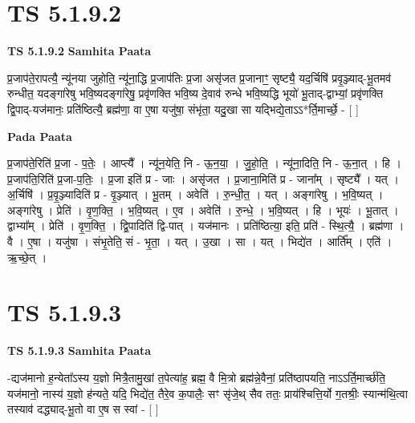\documentclass[17pt]{extarticle}
\begin{document}

\section{ TS 5.1.9.2 }

\textbf{TS 5.1.9.2 } \newline
\textbf{Samhita Paata} \newline

प्र॒जाप॑ते॒रापत्यै॒ न्यू॑नया जुहोति॒ न्यू॑ना॒द्धि प्र॒जाप॑तिः प्र॒जा असृ॑जत प्र॒जानाꣳ॒॒ सृष्ट्यै॒ यद॒र्चिषि॑ प्रवृ॒ञ्ज्याद्-भू॒तमव॑ रुन्धीत॒ यदङ्गा॑रेषु भवि॒ष्यदङ्गा॑रेषु॒ प्रवृ॑णक्ति भवि॒ष्य दे॒वाव॑ रुन्धे भवि॒ष्यद्धि भूयो॑ भू॒ताद्-द्वाभ्यां॒ प्रवृ॑णक्ति द्वि॒पाद्-यज॑मानः॒ प्रति॑ष्ठित्यै॒ ब्रह्म॑णा॒ वा ए॒षा यजु॑षा॒ संभृ॑ता॒ यदु॒खा सा यद्भिद्ये॒ताऽऽ*र्ति॒मार्च्छे॒ - [  ] \newline

\textbf{Pada Paata} \newline

प्र॒जाप॑ते॒रिति॑ प्र॒जा - प॒तेः॒ । आप्त्यै᳚ । न्यू॑न॒येति॒ नि - ऊ॒न॒या॒ । जु॒हो॒ति॒ । न्यू॑ना॒दिति॒ नि - ऊ॒ना॒त् । हि । प्र॒जाप॑ति॒रिति॑ प्र॒जा-प॒तिः॒ । प्र॒जा इति॑ प्र - जाः । असृ॑जत । प्र॒जाना॒मिति॑ प्र - जाना᳚म् । सृष्ट्यै᳚ । यत् । अ॒र्चिषि॑ । प्र॒वृ॒ञ्ज्यादिति॑ प्र - वृ॒ञ्ज्यात् । भू॒तम् । अवेति॑ । रु॒न्धी॒त॒ । यत् । अङ्गा॑रेषु । भ॒वि॒ष्यत् । अङ्गा॑रेषु । प्रेति॑ । वृ॒ण॒क्ति॒ । भ॒वि॒ष्यत् । ए॒व । अवेति॑ । रु॒न्धे॒ । भ॒वि॒ष्यत् । हि । भूयः॑ । भू॒तात् । द्वाभ्या᳚म् । प्रेति॑ । वृ॒ण॒क्ति॒ । द्वि॒पादिति॑ द्वि-पात् । यज॑मानः । प्रति॑ष्ठित्या॒ इति॒ प्रति॑ - स्थि॒त्यै॒ । ब्रह्म॑णा । वै । ए॒षा । यजु॑षा । संभृ॒तेति॒ सं - भृ॒ता॒ । यत् । उ॒खा । सा । यत् । भिद्ये॑त । आर्ति᳚म् । एति॑ । ऋ॒च्छे॒त् ।  \newline





\section{ TS 5.1.9.3 }

\textbf{TS 5.1.9.3 } \newline
\textbf{Samhita Paata} \newline

-द्यज॑मानो ह॒न्येता᳚ऽस्य य॒ज्ञो मित्रै॒तामु॒खां त॒पेत्या॑ह॒ ब्रह्म॒ वै मि॒त्रो ब्रह्म॑न्ने॒वैनां॒ प्रति॑ष्ठापयति॒ नाऽऽर्ति॒मार्च्छ॑ति॒ यज॑मानो॒ नास्य॑ य॒ज्ञो ह॑न्यते॒ यदि॒ भिद्ये॑त॒ तैरे॒व क॒पालैः॒ सꣳ सृ॑जे॒थ् सैव ततः॒ प्राय॑श्चित्ति॒र्यो ग॒तश्रीः॒ स्यान्म॑थि॒त्वा तस्याव॑ दद्ध्याद्-भू॒तो वा ए॒ष स स्वां - [  ] \newline
\end{document}
